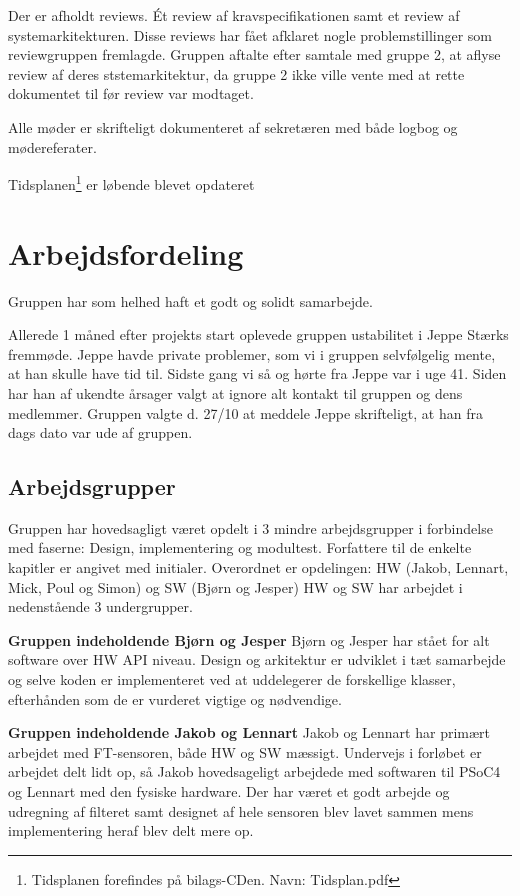 Der er afholdt reviews. Ét review af kravspecifikationen samt et review af systemarkitekturen. 
Disse reviews har fået afklaret nogle problemstillinger som reviewgruppen fremlagde. 
Gruppen aftalte efter samtale med gruppe 2, at aflyse review af deres ststemarkitektur, da gruppe 2 ikke ville vente med at rette dokumentet til før review var modtaget.  

Alle møder er skrifteligt dokumenteret af sekretæren med både logbog og mødereferater. 

Tidsplanen\footnote{Tidsplanen forefindes på bilags-CDen. Navn: Tidsplan.pdf} er løbende blevet opdateret 

\section{Arbejdsfordeling}

Gruppen har som helhed haft et godt og solidt samarbejde. 

Allerede 1 måned efter projekts start oplevede gruppen ustabilitet i Jeppe Stærks fremmøde. Jeppe havde private problemer, som vi i gruppen selvfølgelig mente, at han skulle have tid til. Sidste gang vi så og hørte fra Jeppe var i uge 41. Siden har han af ukendte årsager valgt at ignore alt kontakt til gruppen og dens medlemmer. Gruppen valgte d. 27/10 at meddele Jeppe skrifteligt, at han fra dags dato var ude af gruppen.     

\subsection{Arbejdsgrupper}
Gruppen har hovedsagligt været opdelt i 3 mindre arbejdsgrupper i forbindelse med faserne: Design, implementering og modultest. Forfattere til de enkelte kapitler er angivet med initialer.
Overordnet er opdelingen: HW (Jakob, Lennart, Mick, Poul og Simon) og SW (Bjørn og Jesper) 
HW og SW har arbejdet i nedenstående 3 undergrupper.

\textbf{Gruppen indeholdende Bjørn og Jesper} \newline
Bjørn og Jesper har stået for alt software over HW API niveau. Design og arkitektur er udviklet i tæt samarbejde og selve koden er implementeret ved at uddelegerer de forskellige klasser, efterhånden som de er vurderet vigtige og nødvendige.

\textbf{Gruppen indeholdende Jakob og Lennart} \newline
Jakob og Lennart har primært arbejdet med FT-sensoren, både HW og SW mæssigt. Undervejs i forløbet er arbejdet delt lidt op, så Jakob hovedsageligt arbejdede med softwaren til PSoC4 og Lennart med den fysiske hardware. Der har været et godt arbejde og udregning af filteret samt designet af hele sensoren blev lavet sammen mens implementering heraf blev delt mere op. 


